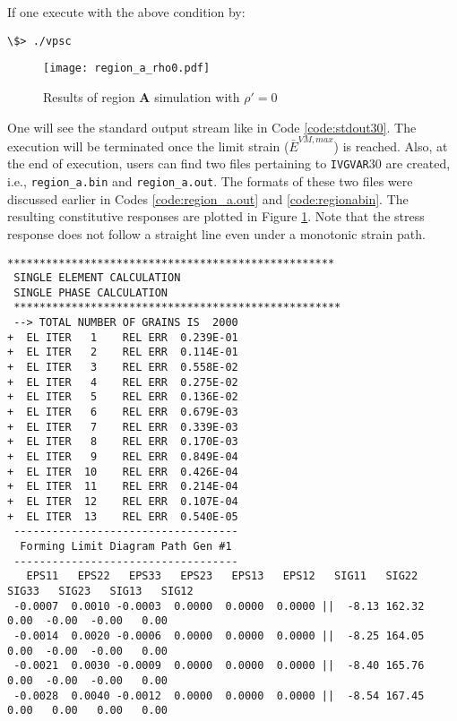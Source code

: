 \documentclass[12pt]{amsart}
\begin{document}
If one execute with the above condition by:
\begin{lstlisting}[style=sh, caption=Execution command of VPSC-FLD]
\$> ./vpsc
\end{lstlisting}
\begin{figure}
  \texttt{[image: region\_a\_rho0.pdf]}
  \caption{Results of region \textbf{A} simulation with $\rho'=0$}
  \label{fig:region_a_rho0}
\end{figure}
One will see the standard output stream like in Code \ref{code:stdout30}.
The execution will be terminated once the limit strain ($\bar{E}^{VM, max}$) is reached.
Also, at the end of execution, users can find two files pertaining to \verb$IVGVAR$30 are created, i.e., \verb$region_a.bin$ and \verb$region_a.out$.
The formats of these two files were discussed earlier in Codes \ref{code:region_a.out} and \ref{code:regionabin}.
The resulting constitutive responses are plotted in Figure \ref{fig:region_a_rho0}.
Note that the stress response does not follow a straight line even under a monotonic strain path.
\begin{lstlisting}[style=sh, caption=Output from running PROC 30, label={code:stdout30}]
 ***************************************************
 SINGLE ELEMENT CALCULATION
 SINGLE PHASE CALCULATION
 ***************************************************
 --> TOTAL NUMBER OF GRAINS IS  2000
+  EL ITER   1    REL ERR  0.239E-01
+  EL ITER   2    REL ERR  0.114E-01
+  EL ITER   3    REL ERR  0.558E-02
+  EL ITER   4    REL ERR  0.275E-02
+  EL ITER   5    REL ERR  0.136E-02
+  EL ITER   6    REL ERR  0.679E-03
+  EL ITER   7    REL ERR  0.339E-03
+  EL ITER   8    REL ERR  0.170E-03
+  EL ITER   9    REL ERR  0.849E-04
+  EL ITER  10    REL ERR  0.426E-04
+  EL ITER  11    REL ERR  0.214E-04
+  EL ITER  12    REL ERR  0.107E-04
+  EL ITER  13    REL ERR  0.540E-05
 -----------------------------------
  Forming Limit Diagram Path Gen #1
 -----------------------------------
   EPS11   EPS22   EPS33   EPS23   EPS13   EPS12   SIG11   SIG22   SIG33   SIG23   SIG13   SIG12
 -0.0007  0.0010 -0.0003  0.0000  0.0000  0.0000 ||  -8.13 162.32   0.00  -0.00  -0.00   0.00
 -0.0014  0.0020 -0.0006  0.0000  0.0000  0.0000 ||  -8.25 164.05   0.00  -0.00  -0.00   0.00
 -0.0021  0.0030 -0.0009  0.0000  0.0000  0.0000 ||  -8.40 165.76   0.00  -0.00  -0.00   0.00
 -0.0028  0.0040 -0.0012  0.0000  0.0000  0.0000 ||  -8.54 167.45   0.00   0.00   0.00   0.00
\end{lstlisting}
\end{document}

